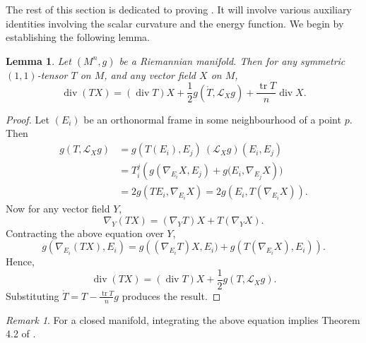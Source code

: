 \documentclass{amsart}
\newcommand{\lie}[1]{\mathcal{L}_{#1}}
\DeclareMathOperator*{\divergence}{div}
\DeclareMathOperator*{\trace}{tr}
\theoremstyle{plain}
\theoremstyle{plain}
\theoremstyle{plain}
\theoremstyle{plain}
\newtheorem{lemma}{Lemma}
\theoremstyle{remark}
\newtheorem{remark}{Remark}
\begin{document}
The rest of this section is dedicated to proving .
It will involve various auxiliary identities involving the scalar curvature and the energy function.
We begin by establishing the following lemma.

\begin{lemma}\label{lem: divergence of TX}
Let $(M^n,g)$ be a  Riemannian manifold. Then  for  any symmetric $(1,1)$-tensor $T$ on $M$, and any vector field $X$ on $M$,
    $$ \divergence (TX) = (\divergence T) X + \frac{1}{2}g\left(\mathring{T},\lie{X}g\right) + \frac{\trace T}{n} \divergence X .$$
\end{lemma}
\begin{proof}
	Let $(E_i)$ be an orthonormal frame in some neighbourhood of a point $p$.
	Then  
	\begin{align*}
		g (T , \lie{X} g ) &= g (T (E_i) , E_j)~ (\lie{X} g )(E_i, E_j) \\
		& = T_{i}^j \left( g ( \nabla_{E_i} X , E_j) + g ( E_i, \nabla_{E_j} X \right)) \\	
		&  = 2 g ( T E_i , \nabla_{E_i} X ) =  2 g ( E_i , T( \nabla_{E_i} X ) ) .
	\end{align*}
	Now  for any vector field $Y$, 
	$$ \nabla_Y ( T X ) = (\nabla_Y T) X + T (\nabla_Y X).  $$
	Contracting the above equation over $Y$,
	$$ g(\nabla_{E_i}(TX) , E_i) = g \left( (\nabla_{E_i} T ) X , E_i) + g ( T (\nabla_{E_i} X), E_i )\right). $$
	Hence,
	\begin{equation*}
		\divergence (TX) = (\divergence T ) X + \frac{1}{2} g ( T , \lie{X} g ).
	\end{equation*}
	Substituting $ \mathring{T} = T - \frac{\trace T }{n} g$ produces the result.
\end{proof}



\begin{remark}
For a closed manifold, integrating the above equation  implies  Theorem 4.2 of \cite{MR4393949}.  
\end{remark}
\end{document}
